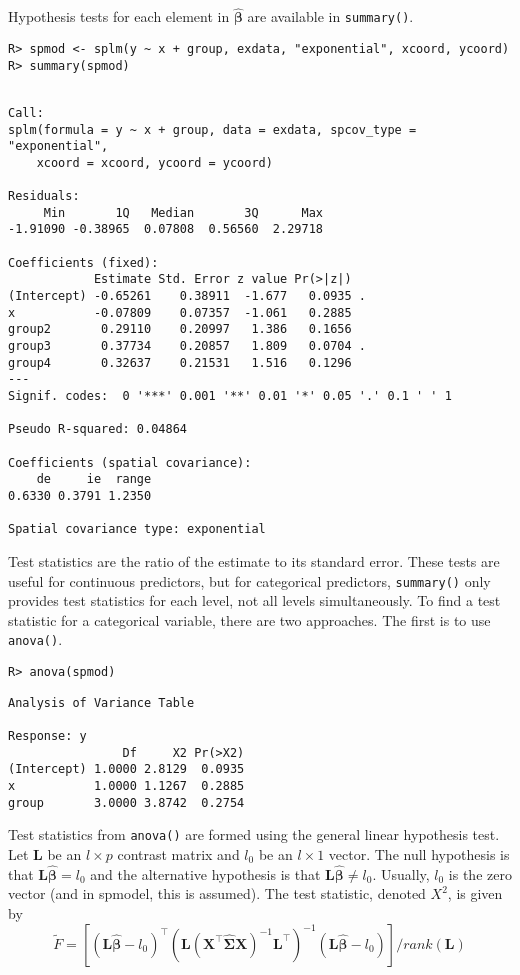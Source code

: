 \documentclass{article}
\begin{document}
Hypothesis tests for each element in \(\hat{\bm{\beta}}\) are available
in \texttt{summary()}.

\begin{verbatim}
R> spmod <- splm(y ~ x + group, exdata, "exponential", xcoord, ycoord)
R> summary(spmod)
\end{verbatim}

\begin{verbatim}

Call:
splm(formula = y ~ x + group, data = exdata, spcov_type = "exponential", 
    xcoord = xcoord, ycoord = ycoord)

Residuals:
     Min       1Q   Median       3Q      Max 
-1.91090 -0.38965  0.07808  0.56560  2.29718 

Coefficients (fixed):
            Estimate Std. Error z value Pr(>|z|)  
(Intercept) -0.65261    0.38911  -1.677   0.0935 .
x           -0.07809    0.07357  -1.061   0.2885  
group2       0.29110    0.20997   1.386   0.1656  
group3       0.37734    0.20857   1.809   0.0704 .
group4       0.32637    0.21531   1.516   0.1296  
---
Signif. codes:  0 '***' 0.001 '**' 0.01 '*' 0.05 '.' 0.1 ' ' 1

Pseudo R-squared: 0.04864

Coefficients (spatial covariance):
    de     ie  range 
0.6330 0.3791 1.2350 

Spatial covariance type: exponential
\end{verbatim}

Test statistics are the ratio of the estimate to its standard error.
These tests are useful for continuous predictors, but for categorical
predictors, \texttt{summary()} only provides test statistics for each
level, not all levels simultaneously. To find a test statistic for a
categorical variable, there are two approaches. The first is to use
\texttt{anova()}.

\begin{verbatim}
R> anova(spmod)
\end{verbatim}

\begin{verbatim}
Analysis of Variance Table

Response: y
                Df     X2 Pr(>X2)
(Intercept) 1.0000 2.8129  0.0935
x           1.0000 1.1267  0.2885
group       3.0000 3.8742  0.2754
\end{verbatim}

Test statistics from \texttt{anova()} are formed using the general
linear hypothesis test. Let \(\mathbf{L}\) be an \(l \times p\) contrast
matrix and \(l_0\) be an \(l \times 1\) vector. The null hypothesis is
that \(\mathbf{L} \bm{\hat{\beta}} = l_0\) and the alternative
hypothesis is that \(\mathbf{L} \bm{\hat{\beta}} \neq l_0\). Usually,
\(l_0\) is the zero vector (and in spmodel, this is assumed). The test
statistic, denoted \(X^2\), is given by \begin{equation}\label{eq:glht}
  \tilde{F} = [(\mathbf{L} \bm{\hat{\beta}} - l_0)^\intercal(\mathbf{L} (\mathbf{X}^\intercal \mathbf{\hat{\Sigma}} \mathbf{X})^{-1} \mathbf{L}^\intercal)^{-1}(\mathbf{L} \bm{\hat{\beta}} - l_0)]/ rank(\mathbf{L})
\end{equation}
\end{document}
